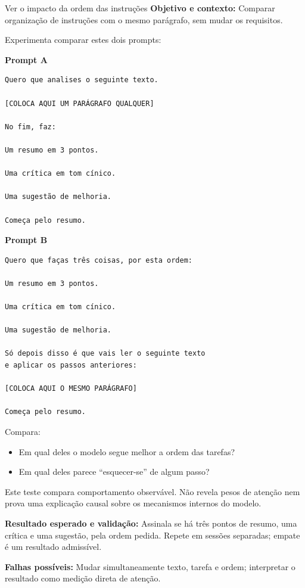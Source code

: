 \begin{promptlabbox}{Ver o impacto da ordem das instruções}
\textbf{Objetivo e contexto:} Comparar organização de instruções com o mesmo parágrafo, sem mudar os requisitos.

Experimenta comparar estes dois prompts:

\medskip

\textbf{Prompt A}

\begin{lstlisting}
Quero que analises o seguinte texto.

[COLOCA AQUI UM PARÁGRAFO QUALQUER]

No fim, faz:

Um resumo em 3 pontos.

Uma crítica em tom cínico.

Uma sugestão de melhoria.

Começa pelo resumo.
\end{lstlisting}

\medskip

\textbf{Prompt B}

\begin{lstlisting}
Quero que faças três coisas, por esta ordem:

Um resumo em 3 pontos.

Uma crítica em tom cínico.

Uma sugestão de melhoria.

Só depois disso é que vais ler o seguinte texto
e aplicar os passos anteriores:

[COLOCA AQUI O MESMO PARÁGRAFO]

Começa pelo resumo.
\end{lstlisting}

Compara:
\begin{itemize}[leftmargin=*]
\item Em qual deles o modelo segue melhor a ordem das tarefas?
\item Em qual deles parece “esquecer-se” de algum passo?
\end{itemize}

Este teste compara comportamento observável. Não revela pesos de atenção nem prova uma explicação causal sobre os mecanismos internos do modelo.

\textbf{Resultado esperado e validação:} Assinala se há três pontos de resumo, uma crítica e uma sugestão, pela ordem pedida. Repete em sessões separadas; empate é um resultado admissível.

\textbf{Falhas possíveis:} Mudar simultaneamente texto, tarefa e ordem; interpretar o resultado como medição direta de atenção.
\end{promptlabbox}

